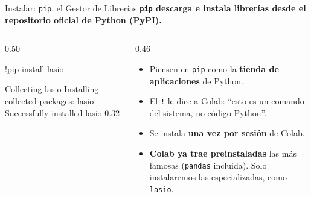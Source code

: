 \documentclass[aspectratio=169, 11pt]{beamer}
\begin{document}
\begin{frame}[fragile,shrink=10]{Instalar: \texttt{pip}, el Gestor de Librerías}
  \vspace{-4pt}
  {\small\color{arcaDark}\bfseries
    \texttt{pip} descarga e instala librerías desde el repositorio oficial de Python (PyPI).}

  \vspace{6pt}
  \begin{columns}[T]
    \begin{column}{0.50\textwidth}
      \begin{pyblock}
!pip install lasio
      \end{pyblock}
      \vspace{2pt}
      \begin{outputblock}
Collecting lasio
Installing collected packages: lasio
Successfully installed lasio-0.32
      \end{outputblock}
    \end{column}

    \begin{column}{0.46\textwidth}
      {\scriptsize\color{textMuted}
      \begin{itemize}\setlength{\itemsep}{5pt}
        \item[{\color{arcaRed}\scriptsize\faArrowRight}]
          Piensen en \texttt{pip} como la
          \textbf{tienda de aplicaciones} de Python.
        \item[{\color{arcaRed}\scriptsize\faArrowRight}]
          El \texttt{!} le dice a Colab: ``esto es un
          comando del sistema, no código Python''.
        \item[{\color{arcaRed}\scriptsize\faArrowRight}]
          Se instala \textbf{una vez por sesión}
          de Colab.
        \item[{\color{codeGreen}\scriptsize\faCheck}]
          \textbf{Colab ya trae preinstaladas} las más
          famosas (\texttt{pandas} incluida). Solo
          instalaremos las especializadas, como \texttt{lasio}.
      \end{itemize}
      }
    \end{column}
  \end{columns}
\end{frame}
\end{document}
